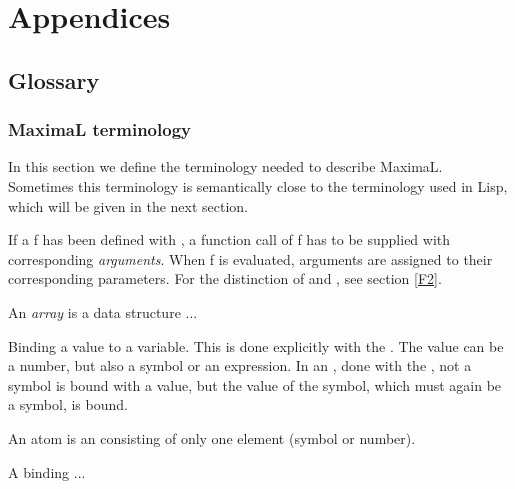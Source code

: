 \documentclass[../Maxima_Workbook.tex]{subfiles}
\begin{document}
	
\appendix	
\part{Appendices}

\chapter{Glossary}

\section{MaximaL terminology}

In this section we define the terminology needed to describe MaximaL. Sometimes this terminology is semantically close to the terminology used in Lisp, which will be given in the next section.

\lzz {} 

\lz If a  f has been defined with , a function call of f has to be supplied with corresponding \emph{arguments}. When f is evaluated, arguments are assigned to their corresponding parameters. For the distinction of  and , see section \ref{F2}.

\lzz {} 

\lz An \emph{array} is a data structure ...

\lzz {} 

\lz Binding a value to a variable. This is done explicitly with the . The value can be a number, but also a symbol or an expression. In an , done with the , not a symbol is bound with a value, but the value of the symbol, which must again be a symbol, is bound.

\lzz {} 

\lz An atom is an  consisting of only one element (symbol or number).

\lzz {} 

\lz A binding ...

\lzz {} 
\end{document}

